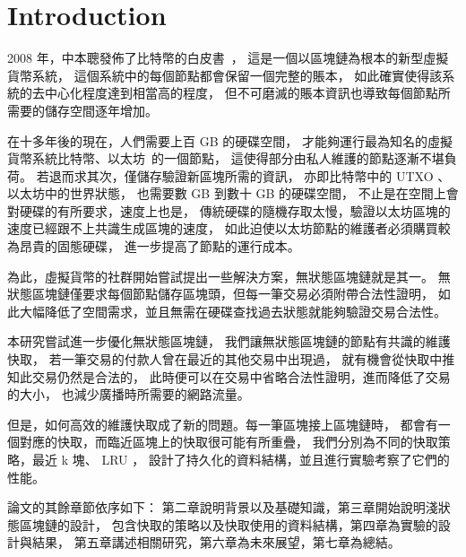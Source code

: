 \chapter{Introduction}
\label{c:intro}

2008 年，中本聰發佈了比特幣的白皮書~\cite{nakamoto2019bitcoin}，
這是一個以區塊鏈為根本的新型虛擬貨幣系統，
這個系統中的每個節點都會保留一個完整的賬本，
如此確實使得該系統的去中心化程度達到相當高的程度，
但不可磨滅的賬本資訊也導致每個節點所需要的儲存空間逐年增加。

在十多年後的現在，人們需要上百 GB 的硬碟空間，
才能夠運行最為知名的虛擬貨幣系統比特幣、以太坊~\cite{wood2014ethereum}的一個節點，
這使得部分由私人維護的節點逐漸不堪負荷。
若退而求其次，僅儲存驗證新區塊所需的資訊，
亦即比特幣中的 UTXO 、以太坊中的世界狀態，
也需要數 GB 到數十 GB 的硬碟空間，
不止是在空間上會對硬碟的有所要求，速度上也是，
傳統硬碟的隨機存取太慢，驗證以太坊區塊的速度已經跟不上共識生成區塊的速度，
如此迫使以太坊節點的維護者必須購買較為昂貴的固態硬碟，
進一步提高了節點的運行成本。

為此，虛擬貨幣的社群開始嘗試提出一些解決方案，無狀態區塊鏈就是其一。
無狀態區塊鏈僅要求每個節點儲存區塊頭，但每一筆交易必須附帶合法性證明，
如此大幅降低了空間需求，並且無需在硬碟查找過去狀態就能夠驗證交易合法性。

本研究嘗試進一步優化無狀態區塊鏈，
我們讓無狀態區塊鏈的節點有共識的維護快取，
若一筆交易的付款人曾在最近的其他交易中出現過，
就有機會從快取中推知此交易仍然是合法的，
此時便可以在交易中省略合法性證明，進而降低了交易的大小，
也減少廣播時所需要的網路流量。

但是，如何高效的維護快取成了新的問題。每一筆區塊接上區塊鏈時，
都會有一個對應的快取，而臨近區塊上的快取很可能有所重疊，
我們分別為不同的快取策略，最近 k 塊、 LRU ，
設計了持久化的資料結構，並且進行實驗考察了它們的性能。

論文的其餘章節依序如下：
第二章說明背景以及基礎知識，第三章開始說明淺狀態區塊鏈的設計，
包含快取的策略以及快取使用的資料結構，第四章為實驗的設計與結果，
第五章講述相關研究，第六章為未來展望，第七章為總結。